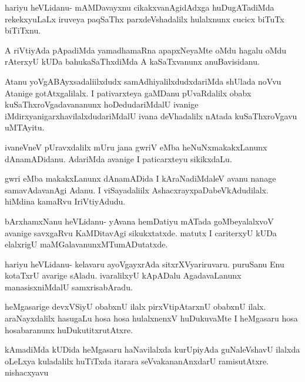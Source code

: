 \documentclass{article}
\begin{document}
\begin{mng}%
hariyu heVLidanu- mAMDavayxnu cikakxvanAgidAdxga huDugATadiMda
rekekxyuLaLx iruveya paqSaThx parxdeVshadalilx hulalxnunx cucicx biTuTx biTiTxnu.
\end{mng}

\begin{mng}%
A riVtiyAda pApadiMda yamadhamaRna apapxNeyaMte oMdu
hagalu oMdu rAterxyU kUDa bahukaSaThxdiMda A kaSaTxvanunx anuBavisidanu.
\end{mng}

\begin{mng}%
Atanu yoVgABAyxsadaliilxdudx samAdhiyalilxdudxdariMda shUlada
noVvu Atanige gotAtxgalilalx. I pativarxteya gaMDanu pUvaRdalilx obabx
kuSaThxroVgadavananunx hoDedudariMdalU ivanige iMdirxyanigarxhavilalxdudariMdalU
ivana deVhadalilx nAtada kuSaThxroVgavu uMTAyitu.
\end{mng}

\begin{mng}%
ivaneVneV pUravxdalilx mUru jana gwriV eMba heNuNxmakakxLanunx
dAnamADidanu. AdariMda avanige I paticarxteyu sikikxdaLu.
\end{mng}

\begin{mng}%
gwri eMba makakxLanunx dAnamADida I kAraNadiMdaleV avanu
nanage samavAdavanAgi Adanu. I viSayadaliilx AshacxrayxpaDabeVkAdudilalx.
hiMdina kamaRvu IriVtiyAdudu.
\end{mng}

\begin{mng}%
bArxhamxNanu heVLidanu- yAvana hemDatiyu mATada goMbeyalalxvoV
avanige savxgaRvu KaMDitavAgi sikukxtatxde. matutx I cariterxyU
kUDa elalxrigU maMGalavanunxMTumADutatxde.
\end{mng}

\begin{mng}%
hariyu heVLidanu- kelavaru ayoVgayxrAda sitxrXVyariruvaru.
puruSanu Enu kotaTxrU avarige sAladu. ivaralilxyU kApADalu AgadavaLanunx 
manasisxniMdalU samxrisabAradu.
\end{mng}

\begin{mng}%
heMgasarige devxVSiyU obabxnU ilalx pirxVtipAtarxnU obabxnU
ilalx. araNayxdalilx hasugaLu hosa hosa hulalxnenxV huDukuvaMte I heMgasaru
hosa hosabaranunx huDukutitxrutAtxre.
\end{mng}

\begin{mng}%
kAmadiMda kUDida heMgasaru haNavilalxda kurUpiyAda guNaleVshavU
ilalxda oLeLxya kuladalilx huTiTxda itarara seVvakananAnxdarU ramisutAtxre.
nishacxyavu
\end{mng}
\end{document}
